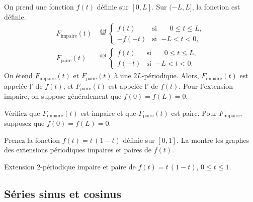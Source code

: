 On prend une fonction $f(t)$ définie sur $[0,L]$.  Sur $(-L,L]$, la fonction est définie.
\begin{align*}
F_{\text{impaire}}(t) & \overset{\text{déf}}{=}
\begin{cases}
f(t) & \text{si } \; \phantom{-}0 \leq t \leq L , \\
-f(-t) & \text{si } \; {-L} < t < 0 ,
\end{cases}
\\
F_{\text{paire}}(t) & \overset{\text{déf}}{=}
\begin{cases}
f(t) & \text{si } \; \phantom{-}0 \leq t \leq L , \\
f(-t) & \text{si } \; {-L} < t < 0 .
\end{cases}
\end{align*}
On étend $F_{\text{impaire}}(t)$ et $F_{\text{paire}}(t)$ à une $2L$-périodique.
Alors, $F_{\text{impaire}}(t)$ est appelée l' \emph{} de $f(t)$, et $F_{\text{paire}}(t)$ est appelée l'\emph{} de $f(t)$.  %
Pour l'extension impaire, on suppose généralement que $f(0) = f(L) = 0$.

\begin{exercise}
Vérifiez que $F_{\text{impaire}}(t)$ est impaire et que  $F_{\text{paire}}(t)$ est paire.
Pour $F_{\text{impaire}}$, supposez que $f(0) = f(L) = 0$.
\end{exercise}

\begin{example}
Prenez la fonction $f(t) = t\,(1-t)$ définie sur $[0,1]$. 
La  montre les graphes des extensions périodiques impaires et paires de $f(t)$.  %

\begin{myfig}
\capstart
\caption{Extension 2-périodique impaire et paire de $f(t) =
t\,(1-t)$, $0 \leq t \leq 1$.\label{scs:oddevenextfig}}
\end{myfig}  %
\end{example}

\subsection{Séries sinus et cosinus}

